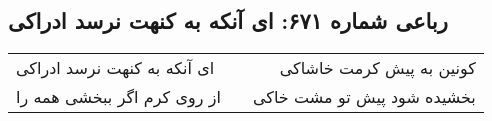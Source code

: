 \begin{center}
\section*{رباعی شماره ۶۷۱: ای آنکه به کنهت نرسد ادراکی}
\label{sec:sh671}
\begin{longtable}{l p{0.5cm} r}
ای آنکه به کنهت نرسد ادراکی
&&
کونین به پیش کرمت خاشاکی
\\
از روی کرم اگر ببخشی همه را
&&
بخشیده شود پیش تو مشت خاکی
\\
\end{longtable}
\end{center}
